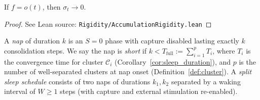 \begin{proposition}
\label{prop:accum_sublinear}
\leanok
{}
If\/ $f = o(t)$, then $\sigma_t \to 0$.
\end{proposition}

\begin{proof}
\leanok
{}
See Lean source: \texttt{Rigidity/AccumulationRigidity.lean}
\end{proof}

\begin{definition}[Nap]
\label{def:nap}
\leanok
A \emph{nap} of duration $k$ is an $S = 0$ phase with capture disabled
lasting exactly $k$ consolidation steps.  We say the nap is
\emph{short} if $k < T_{\mathrm{full}} := \sum_{i=1}^{p} T_i$, where
$T_i$ is the convergence time for cluster $\mathcal{C}_i$
(Corollary~\ref{cor:sleep_duration}), and $p$ is the number of
well-separated clusters at nap onset (Definition~\ref{def:cluster}).
A \emph{split sleep schedule} consists of two naps of durations
$k_1, k_2$ separated by a waking interval of $W \geq 1$ steps (with
capture and external stimulation re-enabled).
\end{definition}


